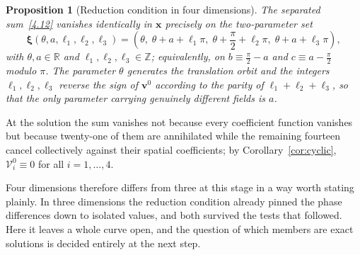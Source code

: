 \documentclass[11pt]{jfm}
\newtheorem{proposition}[lemma]{Proposition}
\numberwithin{equation}{section}
\begin{document}
\begin{proposition}[Reduction condition in four dimensions]
\label{prop:4Dreduction}
The separated sum~\eqref{4.12} vanishes identically in $\boldsymbol{x}$ precisely on the
two-parameter set
\begin{equation}
\label{4.4Dset}
\boldsymbol{\xi}(\theta,a,\ell_1,\ell_2,\ell_3)=
\left(\theta,\;\theta+a+\ell_1\pi,\;\theta+\frac{\pi}{2}+\ell_2\pi,\;\theta+a+\ell_3\pi\right),
\end{equation}
with $\theta,a\in\mathbb{R}$ and $\ell_1,\ell_2,\ell_3\in\mathbb{Z}$; equivalently, on
$b\equiv\tfrac{\pi}{2}-a$ and $c\equiv a-\tfrac{\pi}{2}$ modulo $\pi$. The parameter $\theta$
generates the translation orbit and the integers $\ell_1,\ell_2,\ell_3$ reverse the sign of
$\boldsymbol{v}^0$ according to the parity of $\ell_1+\ell_2+\ell_3$, so that the only parameter
carrying genuinely different fields is $a$.
\end{proposition}

\noindent At the solution the sum vanishes not because every coefficient function vanishes but
because twenty-one of them are annihilated while the remaining fourteen cancel collectively
against their spatial coefficients; by Corollary~\ref{cor:cyclic}, $\mathcal{V}_i^0\equiv0$ for all
$i=1,\ldots,4$.

Four dimensions therefore differs from three at this stage in a way worth stating plainly. In
three dimensions the reduction condition already pinned the phase differences down to isolated
values, and both survived the tests that followed. Here it leaves a whole curve open, and the
question of which members are exact solutions is decided entirely at the next step.
\end{document}
